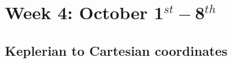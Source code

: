 \documentclass[11pt, oneside]{article}   	%
\begin{document}
\newpage

\section{Week 4: October 1$^{st} - $8$^{th}$}

\subsection{Keplerian to Cartesian coordinates}


 

\end{document}
